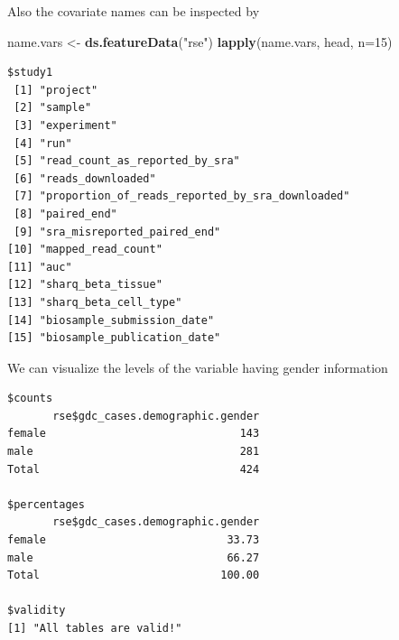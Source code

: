 \documentclass[]{article}
\newenvironment{Shaded}{\begin{snugshade}}{\end{snugshade}}
\newcommand{\DataTypeTok}[1]{\textcolor[rgb]{0.13,0.29,0.53}{#1}}
\newcommand{\DecValTok}[1]{\textcolor[rgb]{0.00,0.00,0.81}{#1}}
\newcommand{\KeywordTok}[1]{\textcolor[rgb]{0.13,0.29,0.53}{\textbf{#1}}}
\newcommand{\NormalTok}[1]{#1}
\newcommand{\StringTok}[1]{\textcolor[rgb]{0.31,0.60,0.02}{#1}}
\begin{document}
Also the covariate names can be inspected by

\begin{Shaded}
\begin{Highlighting}[]
\NormalTok{name.vars <{-}}\StringTok{ }\KeywordTok{ds.featureData}\NormalTok{(}\StringTok{"rse"}\NormalTok{)}
\KeywordTok{lapply}\NormalTok{(name.vars, head, }\DataTypeTok{n=}\DecValTok{15}\NormalTok{)}
\end{Highlighting}
\end{Shaded}

\begin{verbatim}
$study1
 [1] "project"                                       
 [2] "sample"                                        
 [3] "experiment"                                    
 [4] "run"                                           
 [5] "read_count_as_reported_by_sra"                 
 [6] "reads_downloaded"                              
 [7] "proportion_of_reads_reported_by_sra_downloaded"
 [8] "paired_end"                                    
 [9] "sra_misreported_paired_end"                    
[10] "mapped_read_count"                             
[11] "auc"                                           
[12] "sharq_beta_tissue"                             
[13] "sharq_beta_cell_type"                          
[14] "biosample_submission_date"                     
[15] "biosample_publication_date"                    
\end{verbatim}

We can visualize the levels of the variable having gender information

\begin{Shaded}
\end{Shaded}

\begin{verbatim}
$counts
       rse$gdc_cases.demographic.gender
female                              143
male                                281
Total                               424

$percentages
       rse$gdc_cases.demographic.gender
female                            33.73
male                              66.27
Total                            100.00

$validity
[1] "All tables are valid!"
\end{verbatim}
\end{document}
